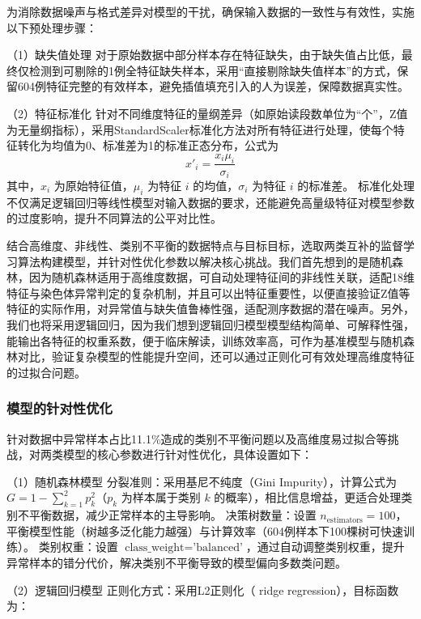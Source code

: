\documentclass[withoutpreface,bwprint]{cumcmthesis} %
\begin{document}
为消除数据噪声与格式差异对模型的干扰，确保输入数据的一致性与有效性，实施以下预处理步骤：  

（1）缺失值处理  
对于原始数据中部分样本存在特征缺失，由于缺失值占比低，最终仅检测到可剔除的1例全特征缺失样本，采用“直接剔除缺失值样本”的方式，保留604例特征完整的有效样本，避免插值填充引入的人为误差，保障数据真实性。  

（2）特征标准化  
针对不同维度特征的量纲差异（如原始读段数单位为“个”，Z值为无量纲指标），采用StandardScaler标准化方法对所有特征进行处理，使每个特征转化为均值为0、标准差为1的标准正态分布，公式为
\begin{equation}
x'_i = \frac{x_{i} \mu_i}{\sigma_i}
\end{equation}
其中，$ x_i $ 为原始特征值，$ \mu_i $ 为特征 $ i $ 的均值，$ \sigma_i $ 为特征 $ i $ 的标准差。  
标准化处理不仅满足逻辑回归等线性模型对输入数据的要求，还能避免高量级特征对模型参数的过度影响，提升不同算法的公平对比性。

结合高维度、非线性、类别不平衡的数据特点与目标目标，选取两类互补的监督学习算法构建模型，并针对性优化参数以解决核心挑战。我们首先想到的是随机森林，因为随机森林适用于高维度数据，可自动处理特征间的非线性关联，适配18维特征与染色体异常判定的复杂机制，并且可以出特征重要性，以便直接验证Z值等特征的实际作用，对异常值与缺失值鲁棒性强，适配测序数据的潜在噪声。另外，我们也将采用逻辑回归，因为我们想到逻辑回归模型模型结构简单、可解释性强，能输出各特征的权重系数，便于临床解读，训练效率高，可作为基准模型与随机森林对比，验证复杂模型的性能提升空间，还可以通过正则化可有效处理高维度特征的过拟合问题。

\subsubsection{模型的针对性优化}

针对数据中异常样本占比11.1\%造成的类别不平衡问题以及高维度易过拟合等挑战，对两类模型的核心参数进行针对性优化，具体设置如下：

（1）随机森林模型
分裂准则：采用基尼不纯度（Gini Impurity），计算公式为 $ G = 1 - \sum_{k=1}^2 p_k^2 $（$ p_k $ 为样本属于类别 $ k $ 的概率），相比信息增益，更适合处理类别不平衡数据，减少正常样本的主导影响。  
决策树数量：设置 $ n_{\text{estimators}} = 100 $，平衡模型性能（树越多泛化能力越强）与计算效率（604例样本下100棵树可快速训练）。  
类别权重：设置 $ \text{class\_weight} = \text{'balanced'} $，通过自动调整类别权重，提升异常样本的错分代价，解决类别不平衡导致的模型偏向多数类问题。  

（2）逻辑回归模型
正则化方式：采用L2正则化（ ridge regression），目标函数为：  
\end{document}
